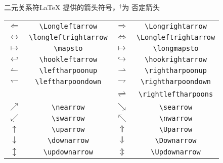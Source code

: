 \documentclass[mathserif]{beamer}
\begin{document}
\begin{frame}[fragile]{二元关系符}{\LaTeX{} 提供的箭头符号，$^{\dagger}$为 \AmS{} 否定箭头}
\begin{table}[H]
\centering
\begin{tabular}{cc|cc}
	\toprule
	$\Longleftarrow$ & \lstinline'\Longleftarrow' & $\Longrightarrow$ & \lstinline'\Longrightarrow' \\
	$\longleftrightarrow$ & \lstinline'\longleftrightarrow' & $\Longleftrightarrow$ & \lstinline'\Longleftrightarrow' \\
	$\mapsto$ & \lstinline'\mapsto' & $\longmapsto$ & \lstinline'\longmapsto' \\
	$\hookleftarrow$ & \lstinline'\hookleftarrow' & $\hookrightarrow$ & \lstinline'\hookrightarrow' \\
	$\leftharpoonup$ & \lstinline'\leftharpoonup' & $\rightharpoonup$ & \lstinline'\rightharpoonup' \\
	$\leftharpoondown$ & \lstinline'\leftharpoondown' & $\rightharpoondown$ & \lstinline'\rightharpoondown' \\
	~ & ~ & $\rightleftharpoons$ & \lstinline'\rightleftharpoons' \\
	$\nearrow$ & \lstinline'\nearrow' & $\searrow$ & \lstinline'\searrow' \\
	$\swarrow$ & \lstinline'\swarrow' & $\nwarrow$ & \lstinline'\nwarrow' \\
	$\uparrow$ & \lstinline'\uparrow' & $\Uparrow$ & \lstinline'\Uparrow' \\
	$\downarrow$ & \lstinline'\downarrow' & $\Downarrow$ & \lstinline'\Downarrow' \\
	$\updownarrow$ & \lstinline'\updownarrow' & $\Updownarrow$ & \lstinline'\Updownarrow' \\
	\bottomrule
\end{tabular}
\end{table}
\end{frame}
\end{document}
